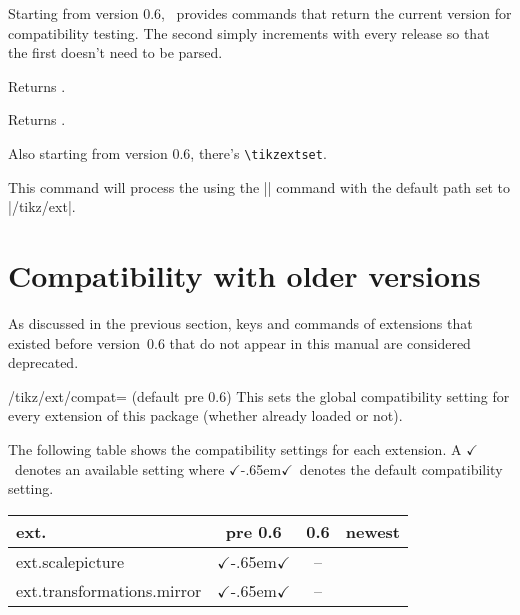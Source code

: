 \begin{multicols}{2}
Starting from version 0.6,
\tikzextname\ provides commands that return the current version for compatibility testing.
The second simply increments with every release
so that the first doesn't need to be parsed.
\begin{command}{\tikzextversion}
  Returns \texttt{\tikzextversion}.
\end{command}
\begin{command}{\tikzextversionnumber}
  Returns \texttt{\tikzextversionnumber}.
\end{command}

Also starting from version 0.6, there's \texttt{\textbackslash tikzextset}.
\begin{command}{\tikzextset{}}
  This command will process the  using the
  |\pgfkeys| command with the default path set to |/tikz/ext|.
\end{command}

\newcolumn
\section{Compatibility with older versions}
As discussed in the previous section,
keys and commands of extensions that existed before version~0.6
that do not appear in this manual are considered deprecated.

\begin{key}{/tikz/ext/compat= (default pre 0.6)}
  This sets the global compatibility setting for every extension of this package
  (whether already loaded or not).

  The following table shows the compatibility settings for each extension.
  \newcommand*\X{$\checkmark$}%
  \newcommand*\Xdef{\X\kern-.65em\X}%
  A \X\ denotes an available setting where \Xdef\ denotes the default compatibility setting.
  \newcommand*\tabHeader[1]{\rotatebox{90}{#1}}
  \begin{center}
  \begin{tabular}{>{\ttfamily ext.}l ccc}
    \toprule
    \multicolumn{1}{l}{Extension} & pre 0.6 & 0.6 & newest \\ \midrule
    scalepicture                  & \Xdef   & --  &        \\
    transformations.mirror        & \Xdef   & --  &        \\ \bottomrule
  \end{tabular}
  \end{center}
\end{key}


\end{multicols}
